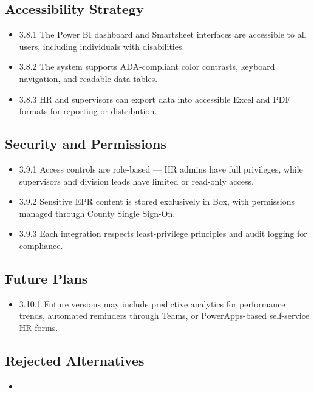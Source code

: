 \documentclass[12pt]{article}
\def\textbf#1{#1}%
\begin{document}
\subsection{Accessibility Strategy}
\begin{itemize}
  \item \textbf{3.8.1} The Power BI dashboard and Smartsheet interfaces are accessible to all users, including individuals with disabilities.
  \item \textbf{3.8.2} The system supports ADA-compliant color contrasts, keyboard navigation, and readable data tables.
  \item \textbf{3.8.3} HR and supervisors can export data into accessible Excel and PDF formats for reporting or distribution.
\end{itemize}

\subsection{Security and Permissions}
\begin{itemize}
  \item \textbf{3.9.1} Access controls are role-based — HR admins have full privileges, while supervisors and division leads have limited or read-only access.
  \item \textbf{3.9.2} Sensitive EPR content is stored exclusively in Box, with permissions managed through County Single Sign-On.
  \item \textbf{3.9.3} Each integration respects least-privilege principles and audit logging for compliance.
\end{itemize}

\subsection{Future Plans}
\begin{itemize}
  \item \textbf{3.10.1} Future versions may include predictive analytics for performance trends, automated reminders through Teams, or PowerApps-based self-service HR forms.
\end{itemize}

\subsection{Rejected Alternatives}
\begin{itemize}
\item[] %
\end{itemize}
\end{document}

